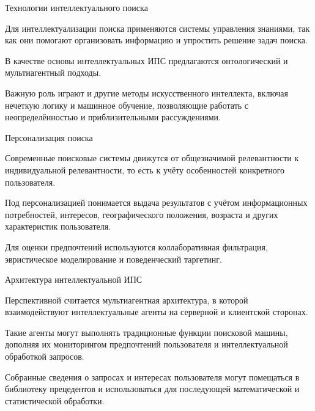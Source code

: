 \begin{frame}{Технологии интеллектуального поиска}
	\topline
	\justifying
	
	\begin{textitemize}
		\item Для интеллектуализации поиска применяются системы управления знаниями, так как они помогают организовать информацию и упростить решение задач поиска.
		\item В качестве основы интеллектуальных ИПС предлагаются онтологический и мультиагентный подходы.
		\item Важную роль играют и другие методы искусственного интеллекта, включая нечеткую логику и машинное обучение, позволяющие работать с неопределённостью и приблизительными рассуждениями.
	\end{textitemize}
\end{frame}

\begin{frame}{Персонализация поиска}
	\topline
	\justifying
	
	\begin{textitemize}
		\item Современные поисковые системы движутся от общезначимой релевантности к индивидуальной релевантности, то есть к учёту особенностей конкретного пользователя.
		\item Под персонализацией понимается выдача результатов с учётом информационных потребностей, интересов, географического положения, возраста и других характеристик пользователя.
		\item Для оценки предпочтений используются коллаборативная фильтрация, эвристическое моделирование и поведенческий таргетинг.
	\end{textitemize}
\end{frame}

\begin{frame}{Архитектура интеллектуальной ИПС}
	\topline
	\justifying
	
	\begin{textitemize}
		\item Перспективной считается мультиагентная архитектура, в которой взаимодействуют интеллектуальные агенты на серверной и клиентской сторонах.
		\item Такие агенты могут выполнять традиционные функции поисковой машины, дополняя их мониторингом предпочтений пользователя и интеллектуальной обработкой запросов.
		\item Собранные сведения о запросах и интересах пользователя могут помещаться в библиотеку прецедентов и использоваться для последующей математической и статистической обработки.
	\end{textitemize}
\end{frame}

